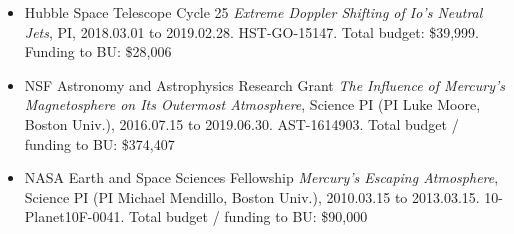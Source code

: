 \documentclass[12pt]{report}
\begin{document}
\begin{itemize}
 \item Hubble Space Telescope Cycle 25 {\it Extreme Doppler Shifting of Io's Neutral Jets}, PI, 2018.03.01 to 2019.02.28. HST-GO-15147. Total budget: \$39,999. Funding to BU: \$28,006
 \item NSF Astronomy and Astrophysics Research Grant {\it The Influence of Mercury's Magnetosphere on Its Outermost Atmosphere}, Science PI (PI Luke Moore, Boston Univ.), 2016.07.15 to 2019.06.30. AST-1614903. Total budget / funding to BU: \$374,407
 \item NASA Earth and Space Sciences Fellowship {\it Mercury's Escaping Atmosphere}, Science PI (PI Michael Mendillo, Boston Univ.), 2010.03.15 to 2013.03.15. 10-Planet10F-0041. Total budget / funding to BU: \$90,000
 \end{itemize}
\vspace{2 mm}
\end{document}
